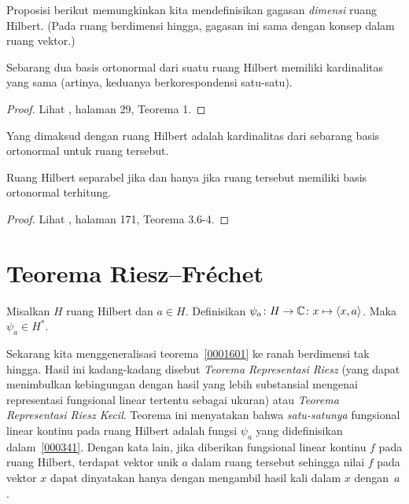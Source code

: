 Proposisi berikut memungkinkan kita mendefinisikan gagasan \emph{dimensi} ruang Hilbert. (Pada ruang berdimensi
hingga, gagasan ini sama dengan konsep dalam ruang vektor.)

\begin{prop} Sebarang dua basis ortonormal dari suatu ruang Hilbert memiliki kardinalitas yang sama (artinya, keduanya
berkorespondensi satu-satu).
\end{prop}

\begin{proof} Lihat \cite{Halmos:1951}, halaman 29, Teorema 1. \ns
\end{proof}

\begin{defn}
Yang dimaksud dengan  ruang Hilbert adalah kardinalitas dari sebarang basis ortonormal untuk ruang tersebut.
\end{defn}

\begin{prop}\label{prop_Schauder_basis_Hsp} Ruang Hilbert separabel jika dan hanya jika ruang tersebut memiliki
basis ortonormal terhitung.
\end{prop}

\begin{proof} Lihat \cite{Kreyszig:1978}, halaman 171, Teorema 3.6-4. \ns
\end{proof}





















\section{Teorema Riesz--Fr\'echet}
\begin{exam}\label{000341} Misalkan $H$ ruang Hilbert dan $a \in H$. Definisikan $\psi_a\colon
H \rightarrow \mathbb{C}\colon x \mapsto \langle x,a \rangle$. Maka $\psi_a \in H^*$.
\end{exam}

Sekarang kita menggeneralisasi teorema~\ref{0001601} ke ranah berdimensi tak hingga. Hasil ini
kadang-kadang disebut \emph{Teorema Representasi Riesz} (yang dapat menimbulkan kebingungan dengan
hasil yang lebih substansial mengenai representasi fungsional linear tertentu sebagai ukuran)
atau \emph{Teorema Representasi Riesz Kecil}. Teorema ini menyatakan bahwa \emph{satu-satunya}
fungsional linear kontinu pada ruang Hilbert adalah fungsi $\psi_a$ yang didefinisikan dalam~\ref{000341}.
Dengan kata lain, jika diberikan fungsional linear kontinu $f$ pada ruang Hilbert, terdapat vektor unik
$a$ dalam ruang tersebut sehingga nilai $f$ pada vektor $x$ dapat dinyatakan hanya dengan mengambil
hasil kali dalam $x$ dengan~$a$.

